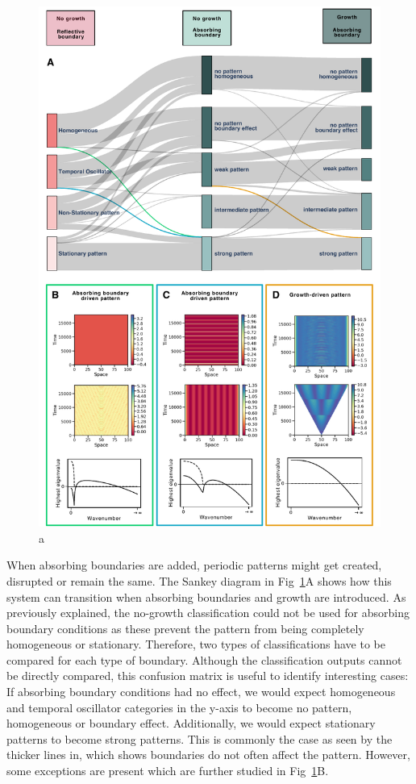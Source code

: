 \begin{figure}[H]
    \includegraphics[width=1\textwidth]{figures/boundaries_growth} %
    \caption{a}
    \label{fig:boundariesgrowth} %
\end{figure}

When absorbing boundaries are added, periodic patterns might get created, disrupted or remain the same. The Sankey diagram in Fig~\ref{fig:boundariesgrowth}A shows how this system can transition when absorbing boundaries and growth are introduced.
As previously explained, the no-growth classification could not be used for absorbing boundary conditions as these prevent the pattern from being completely homogeneous or stationary. %
Therefore, two types of classifications have to be compared for each type of boundary.
Although the classification outputs cannot be directly compared, this confusion matrix is useful to identify interesting cases:
If absorbing boundary conditions had no effect, we would expect homogeneous and temporal oscillator categories in the y-axis to become no pattern, homogeneous or boundary effect.
Additionally, we would expect stationary patterns to become strong patterns.
This is commonly the case as seen by the thicker lines in, which shows boundaries do not often affect the pattern.
However, some exceptions are present which are further studied in Fig~\ref{fig:boundariesgrowth}B.
